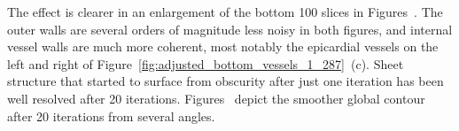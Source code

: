     The effect is clearer in an enlargement of the bottom 100 slices in Figures~. The outer walls are several orders of magnitude less noisy in both figures, and internal vessel walls are much more coherent, most notably the epicardial vessels on the left and right of Figure~\ref{fig:adjusted_bottom_vessels_1_287}~(c). Sheet structure that started to surface from obscurity after just one iteration has been well resolved after 20 iterations. Figures~ depict the smoother global contour after 20 iterations from several angles.
    
    \begin{figure}
      \centering
      \caption{}
      \label{fig:whole_positive_x_diffused}
    \end{figure}

    \begin{figure}
      \centering
      \caption{}
      \label{fig:whole_negative_x_diffused}
    \end{figure}

